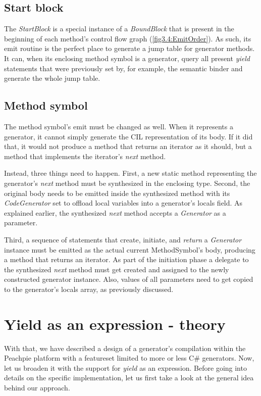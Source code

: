 \subsection{Start block}\label{StartBlock}

The \emph{StartBlock} is a special instance of a \emph{BoundBlock} that is present in the beginning of each method’s control flow graph (\autoref{fig3.4:EmitOrder}). As such, its emit routine is the perfect place to generate a jump table for generator methods. It can, when its enclosing method symbol is a generator, query all present \emph{yield} statements that were previously set by, for example, the semantic binder and generate the whole jump table.

\subsection{Method symbol}

The method symbol’s emit must be changed as well. When it represents a generator, it cannot simply generate the CIL representation of its body. If it did that, it would not produce a method that returns an iterator as it should, but a method that implements the iterator’s \emph{next} method.

Instead, three things need to happen. First, a new static method representing the generator’s \emph{next} method must be synthesized in the enclosing type. Second, the original body needs to be emitted inside the synthesized method with its \emph{CodeGenerator} set to offload local variables into a generator’s locals field. As explained earlier, the synthesized \emph{next} method accepts a \emph{Generator} as a parameter.

Third, a sequence of statements that create, initiate, and \emph{return} a \emph{Generator} instance must be emitted as the actual current MethodSymbol’s body, producing a method that returns an iterator. As part of the initiation phase a delegate to the synthesized \emph{next} method must get created and assigned to the newly constructed generator instance. Also, values of all parameters need to get copied to the generator’s locals array, as previously discussed.

\section{Yield as an expression - theory}

With that, we have described a design of a generator’s compilation within the Peachpie platform with a featureset limited to more or less C\# generators. Now, let us broaden it with the support for \emph{yield} as an expression. Before going into details on the specific implementation, let us first take a look at the general idea behind our approach. 

